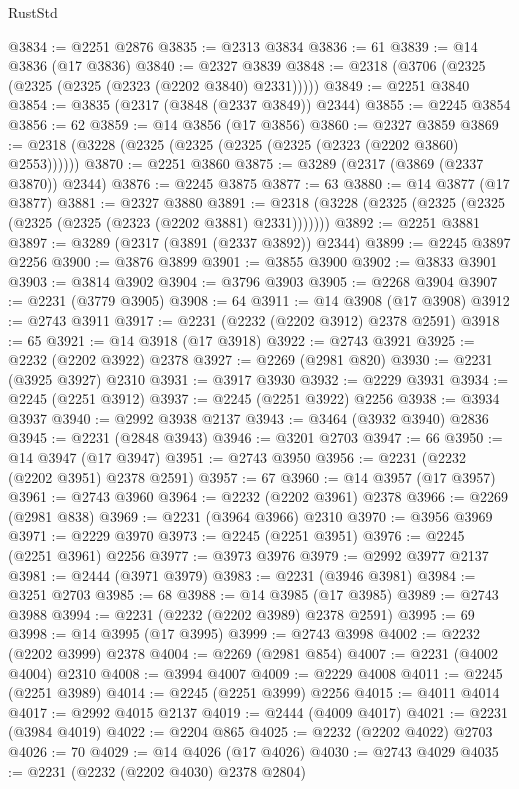 \begin{lexlean}{RustStd}
\begin{coremodule}
@3834 := @2251 @2876
@3835 := @2313 @3834
@3836 := 61
@3839 := @14 @3836 (@17 @3836)
@3840 := @2327 @3839
@3848 := @2318 (@3706 (@2325 (@2325 (@2325 (@2323 (@2202 @3840) @2331)))))
@3849 := @2251 @3840
@3854 := @3835 (@2317 (@3848 (@2337 @3849)) @2344)
@3855 := @2245 @3854
@3856 := 62
@3859 := @14 @3856 (@17 @3856)
@3860 := @2327 @3859
@3869 := @2318 (@3228 (@2325 (@2325 (@2325 (@2325 (@2323 (@2202 @3860) @2553))))))
@3870 := @2251 @3860
@3875 := @3289 (@2317 (@3869 (@2337 @3870)) @2344)
@3876 := @2245 @3875
@3877 := 63
@3880 := @14 @3877 (@17 @3877)
@3881 := @2327 @3880
@3891 := @2318 (@3228 (@2325 (@2325 (@2325 (@2325 (@2325 (@2323 (@2202 @3881) @2331)))))))
@3892 := @2251 @3881
@3897 := @3289 (@2317 (@3891 (@2337 @3892)) @2344)
@3899 := @2245 @3897 @2256
@3900 := @3876 @3899
@3901 := @3855 @3900
@3902 := @3833 @3901
@3903 := @3814 @3902
@3904 := @3796 @3903
@3905 := @2268 @3904
@3907 := @2231 (@3779 @3905)
@3908 := 64
@3911 := @14 @3908 (@17 @3908)
@3912 := @2743 @3911
@3917 := @2231 (@2232 (@2202 @3912) @2378 @2591)
@3918 := 65
@3921 := @14 @3918 (@17 @3918)
@3922 := @2743 @3921
@3925 := @2232 (@2202 @3922) @2378
@3927 := @2269 (@2981 @820)
@3930 := @2231 (@3925 @3927) @2310
@3931 := @3917 @3930
@3932 := @2229 @3931
@3934 := @2245 (@2251 @3912)
@3937 := @2245 (@2251 @3922) @2256
@3938 := @3934 @3937
@3940 := @2992 @3938 @2137
@3943 := @3464 (@3932 @3940) @2836
@3945 := @2231 (@2848 @3943)
@3946 := @3201 @2703
@3947 := 66
@3950 := @14 @3947 (@17 @3947)
@3951 := @2743 @3950
@3956 := @2231 (@2232 (@2202 @3951) @2378 @2591)
@3957 := 67
@3960 := @14 @3957 (@17 @3957)
@3961 := @2743 @3960
@3964 := @2232 (@2202 @3961) @2378
@3966 := @2269 (@2981 @838)
@3969 := @2231 (@3964 @3966) @2310
@3970 := @3956 @3969
@3971 := @2229 @3970
@3973 := @2245 (@2251 @3951)
@3976 := @2245 (@2251 @3961) @2256
@3977 := @3973 @3976
@3979 := @2992 @3977 @2137
@3981 := @2444 (@3971 @3979)
@3983 := @2231 (@3946 @3981)
@3984 := @3251 @2703
@3985 := 68
@3988 := @14 @3985 (@17 @3985)
@3989 := @2743 @3988
@3994 := @2231 (@2232 (@2202 @3989) @2378 @2591)
@3995 := 69
@3998 := @14 @3995 (@17 @3995)
@3999 := @2743 @3998
@4002 := @2232 (@2202 @3999) @2378
@4004 := @2269 (@2981 @854)
@4007 := @2231 (@4002 @4004) @2310
@4008 := @3994 @4007
@4009 := @2229 @4008
@4011 := @2245 (@2251 @3989)
@4014 := @2245 (@2251 @3999) @2256
@4015 := @4011 @4014
@4017 := @2992 @4015 @2137
@4019 := @2444 (@4009 @4017)
@4021 := @2231 (@3984 @4019)
@4022 := @2204 @865
@4025 := @2232 (@2202 @4022) @2703
@4026 := 70
@4029 := @14 @4026 (@17 @4026)
@4030 := @2743 @4029
@4035 := @2231 (@2232 (@2202 @4030) @2378 @2804)

\end{coremodule}
\end{lexlean}
